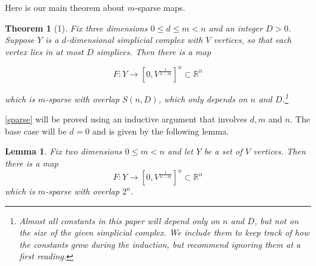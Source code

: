\documentclass[12pt]{article}
\newtheorem*{theorem*}{Theorem}
\newtheorem{lemma}{Lemma}
\newcommand{\RR}{\mathbb{R}}
\begin{document}
	Here is our main theorem about $m$-sparse maps.
	
	\begin{theorem*}[1] Fix three dimensions $0 \le d \le m < n$ and an integer $D > 0$. Suppose $Y$ is a $d$-dimensional simplicial complex with $V$ vertices, so that each vertex lies in at most $D$ simplices. Then there is a map
		
		$$F: Y \to [0, V^{\frac{1}{n-m}}]^{n} \subset \RR^{n}$$
		
		\noindent which is $m$-sparse with overlap $S(n,D)$, which only depends on $n$ and $D$.\footnote{Almost all constants in this paper will depend only on $n$ and $D$, but not on the size of the given simplicial complex. We include them to keep track of how the constants grow during the induction, but recommend ignoring them at a first reading.}
	\end{theorem*}
	
	\cref{sparse} will be proved using an inductive argument that involves $d,m$ and $n$. The base case will be $d=0$ and is given by the following lemma.
	
	\begin{lemma} \label{sparsevertex} Fix two dimensions $0 \le m < n$ and let $Y$ be a set of $V$ vertices. Then there is a map
		$$F: Y \to [0, V^{\frac{1}{n-m}}]^n \subset \RR^n$$
		\noindent which is $m$-sparse with overlap $2^n$.
	\end{lemma}
	
\end{document}
